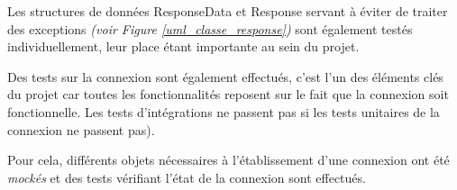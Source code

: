 \medbreak

Les structures de données ResponseData et Response servant à éviter de traiter des exceptions \textit{(voir Figure  \ref{uml_classe_response})} sont également testés individuellement, leur place étant importante au sein du projet.

\bigbreak
Des tests sur la connexion sont également effectués, c'est l'un des éléments clés du projet car toutes les fonctionnalités reposent sur le fait que la connexion soit fonctionnelle. Les tests d'intégrations ne passent pas si les tests unitaires de la connexion ne passent pas).

Pour cela, différents objets nécessaires à l'établissement d'une connexion ont été \textit{mockés} et des tests vérifiant l'état de la connexion sont effectués.

